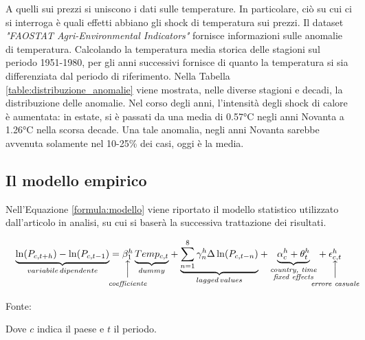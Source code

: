 \noindent\begin{minipage}{\textwidth}
A quelli sui prezzi si uniscono i dati sulle temperature. In particolare, ciò su cui ci si interroga è quali effetti abbiano gli shock di temperatura sui prezzi. Il dataset \textit{"FAOSTAT Agri-Environmental Indicators"} fornisce informazioni sulle anomalie di temperatura. Calcolando la temperatura media storica delle stagioni sul periodo 1951-1980, per gli anni successivi fornisce di quanto la temperatura si sia differenziata dal periodo di riferimento. Nella Tabella \ref{table:distribuzione_anomalie} viene mostrata, nelle diverse stagioni e decadi, la distribuzione delle anomalie. Nel corso degli anni, l'intensità degli shock di calore è aumentata: in estate, si è passati da una media di 0.57°C negli anni Novanta a 1.26°C nella scorsa decade. Una tale anomalia, negli anni Novanta sarebbe avvenuta solamente nel 10-25\% dei casi, oggi è la media.
\end{minipage}

\subsection{Il modello empirico}

Nell'Equazione \ref{formula:modello} viene riportato il modello statistico utilizzato dall'articolo in analisi, su cui si baserà la successiva trattazione dei risultati.

\begin{equation}
	\label{formula:modello}
	{\underbrace{\ln(P_{c,t+h}) - \ln(P_{c,t-1})}_{variabile\,dipendente}} = \vertarrow{\beta^{h}_{1}}{\textit{coefficiente}}\,{\underbrace{Temp_{c,t}}_{dummy}} + {\underbrace{\sum_{n=1}^{8}\gamma_{n}^{h}\Delta\ln(P_{c,t-n})}_{lagged\,values}}+{\underbrace{\alpha_{c}^{h}+\theta_{t}^{h}}_{\substack{\text{\textit{country, time}}\\\text{\textit{fixed effects}}}}}+\vertarrow{\epsilon_{c,t}^{h}}{\textit{errore casuale}}
\end{equation}

\begin{center}
	Fonte: \cite{ECB:feeling_heat}
\end{center}

Dove $c$ indica il paese e $t$ il periodo.

